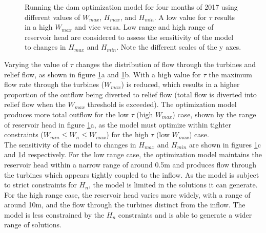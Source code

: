 \documentclass[11pt]{article}
\begin{document}

\begin{figure}
\centering
{}
\caption{Running the dam optimization model for four months of 2017 using different values of $W_{max}$, $H_{max}$, and $H_{min}$. A low value for $\tau$ results in a high $W_{max}$ and vice versa. Low range and high range of reservoir head are considered to assess the sensitivity of the model to changes in $H_{max}$ and $H_{min}$. Note the different scales of the y axes.}
\label{fig:Q2-sensitivity-to-params}
\end{figure}

Varying the value of $\tau$ changes the distribution of flow through the turbines and relief flow, as shown in figure \ref*{fig:Q2-sensitivity-to-params}a and \ref*{fig:Q2-sensitivity-to-params}b. With a high value for $\tau$ the maximum flow rate through the turbines ($W_{max}$) is reduced, which results in a higher proportion of the outflow being diverted to relief flow (total flow is diverted into relief flow when the $W_{max}$ threshold is exceeded). The optimization model produces more total outflow for the low $\tau$ (high $W_{max}$) case, shown by the range of reservoir head in figure \ref*{fig:Q2-sensitivity-to-params}a, as the model must optimize within tighter constraints ($W_{min} \leq W_n \leq W_{max}$) for the high $\tau$ (low $W_{max}$) case.\\

The sensitivity of the model to changes in $H_{max}$ and $H_{min}$ are shown in figures \ref*{fig:Q2-sensitivity-to-params}c and \ref*{fig:Q2-sensitivity-to-params}d respectively. For the low range case, the optimization model maintains the reservoir head within a narrow range of around 0.5m and produces flow through the turbines which appears tightly coupled to the inflow. As the model is subject to strict constraints for $H_n$, the model is limited in the solutions it can generate. For the high range case, the reservoir head varies more widely, with a range of around 10m, and the flow through the turbines distinct from the inflow. The model is less constrained by the $H_n$ constraints and is able to generate a wider range of solutions.\\
\end{document}
